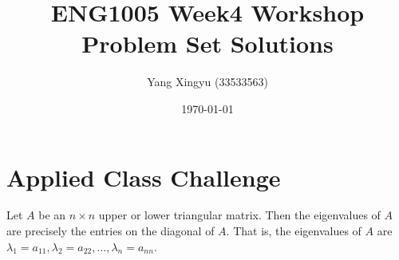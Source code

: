 \documentclass[12pt,a4paper]{article}
\begin{document}
\title{ENG1005 Week4 Workshop Problem Set Solutions}
\author{Yang Xingyu (33533563)}
\date{\today}
\maketitle


\section*{Applied Class Challenge}
\begin{theorem}
    Let \( A \) be an \( n \times n \) upper or lower triangular matrix. Then the eigenvalues of \( A \) are precisely the entries on the diagonal of \( A \). That is, the eigenvalues of \( A \) are \( \lambda_1 = a_{11}, \lambda_2 = a_{22}, \dots, \lambda_n = a_{nn} \).
\end{theorem}
\end{document}

